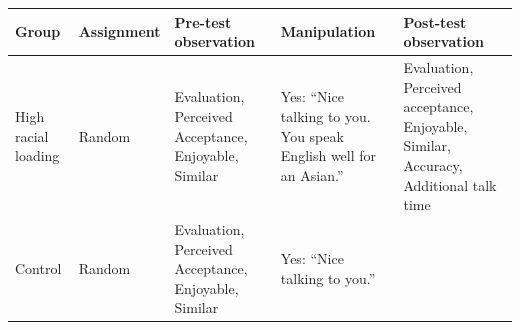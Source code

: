 \documentclass[
  english,
]{book}
\begin{document}
\begin{longtable}[]{@{}lllll@{}}
\toprule
\begin{minipage}[b]{0.10\columnwidth}\raggedright
Group\strut
\end{minipage} & \begin{minipage}[b]{0.17\columnwidth}\raggedright
Assignment\strut
\end{minipage} & \begin{minipage}[b]{0.22\columnwidth}\raggedright
Pre-test observation\strut
\end{minipage} & \begin{minipage}[b]{0.15\columnwidth}\raggedright
Manipulation\strut
\end{minipage} & \begin{minipage}[b]{0.22\columnwidth}\raggedright
Post-test observation\strut
\end{minipage}\tabularnewline
\midrule
\endhead
\begin{minipage}[t]{0.10\columnwidth}\raggedright
High racial loading\strut
\end{minipage} & \begin{minipage}[t]{0.17\columnwidth}\raggedright
Random\strut
\end{minipage} & \begin{minipage}[t]{0.22\columnwidth}\raggedright
Evaluation, Perceived Acceptance, Enjoyable, Similar\strut
\end{minipage} & \begin{minipage}[t]{0.15\columnwidth}\raggedright
Yes: ``Nice talking to you. You speak English well for an Asian.''\strut
\end{minipage} & \begin{minipage}[t]{0.22\columnwidth}\raggedright
Evaluation, Perceived acceptance, Enjoyable, Similar, Accuracy, Additional talk time\strut
\end{minipage}\tabularnewline
\begin{minipage}[t]{0.10\columnwidth}\raggedright
Control\strut
\end{minipage} & \begin{minipage}[t]{0.17\columnwidth}\raggedright
Random\strut
\end{minipage} & \begin{minipage}[t]{0.22\columnwidth}\raggedright
Evaluation, Perceived Acceptance, Enjoyable, Similar\strut
\end{minipage} & \begin{minipage}[t]{0.15\columnwidth}\raggedright
Yes: ``Nice talking to you.''\strut

\end{minipage}
\end{longtable}
\end{document}
